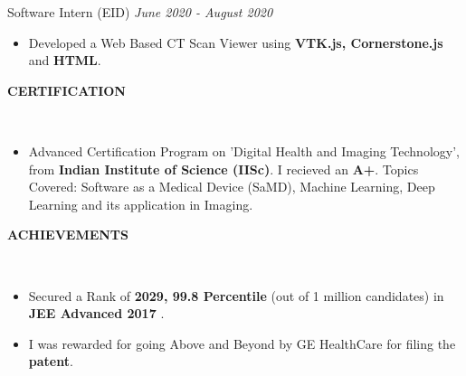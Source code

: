 \documentclass[a4paper,10pt]{article}
\newcommand{\isep}{-2 pt}
\newcommand{\lsep}{-0.6cm}
\newcommand{\resheading}[1]{{\small \colorbox{mygrey}{\begin{minipage}{0.975\textwidth}{\textbf{#1 \vphantom{p\^{E}}}}\end{minipage}}}}
\begin{document}
\begin{itemize}
Software Intern (EID) \hfill \emph{June 2020 - August 2020}
\vspace{-2pt}
	\begin{itemize}\itemsep \isep
	\item  Developed a Web Based CT Scan Viewer using \textbf{VTK.js, Cornerstone.js} and \textbf{HTML}.
	\end{itemize}
\end{itemize}
\vspace{-5pt}

\resheading{\textbf{CERTIFICATION} }\\[\lsep]
\vspace{1.0pt}
\begin{itemize} \itemsep \isep
\item Advanced Certification Program on 'Digital Health and Imaging Technology', from \textbf{Indian Institute of Science (IISc)}. I recieved an \textbf{A+}. Topics Covered: Software as a Medical Device (SaMD), Machine Learning, Deep Learning and its application in Imaging.
\end{itemize}

\vspace{-5pt}

\resheading{\textbf{ACHIEVEMENTS} }\\[\lsep]
\vspace{1.0pt}

\begin{itemize} 
\setlength{\itemsep}{1pt}
\setlength{\parskip}{0pt}
\setlength{\parsep}{0pt}
\item Secured a Rank of \textbf{2029, 99.8 Percentile} (out of 1 million candidates) in \textbf{JEE Advanced 2017} .
\item I was rewarded for going Above and Beyond by GE HealthCare for filing the \textbf{patent}.
\end{itemize}
\vspace{-5pt}
\end{document}
